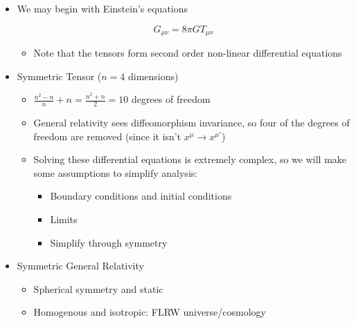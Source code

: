 \begin{itemize}

  \item We may begin with Einstein's equations

    $$G_{\mu\nu}=8\pi G T_{\mu\nu}$$

    \begin{itemize}

      \item Note that the tensors form second order non-linear differential equations

    \end{itemize}

  \item Symmetric Tensor ($n=4$ dimensions)

    \begin{itemize}

      \item $\frac{n^2-n}{n}+n=\frac{n^2+n}{2}=10$ degrees of freedom

      \item General relativity sees diffeomorphism invariance, so four of the degrees of freedom are removed (since it isn't $x^{\mu}\to x^{\mu'}$)

      \item Solving these differential equations is extremely complex, so we will make some assumptions to simplify analysis:

        \begin{itemize}

          \item Boundary conditions and initial conditions

          \item Limits

          \item Simplify through symmetry

        \end{itemize}

    \end{itemize}

  \item Symmetric General Relativity

    \begin{itemize}

      \item Spherical symmetry and static

      \item Homogenous and isotropic: FLRW universe/cosmology


\end{itemize}
\end{itemize}
